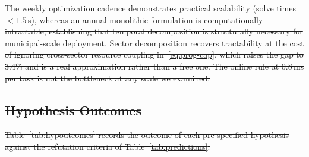 \documentclass[utf8]{FrontiersinHarvard}
\providecommand{\DIFdel}[1]{{\protect\color{red}\sout{#1}}}                      %
\begin{document}
\DIFdel{The weekly optimization cadence demonstrates practical scalability (solve times $<1.5$\,s), whereas an annual monolithic formulation is computationally intractable, establishing that temporal decomposition is structurally necessary for municipal-scale deployment. Sector decomposition recovers tractability at the cost of ignoring cross-sector resource coupling in~\eqref{eq:prog-cap}, which raises the gap to 3.4\% and is a real approximation rather than a free one. The online rule at 0.8\,ms per task is not the bottleneck at any scale we examined.
	}%


\subsection{\DIFdel{Hypothesis Outcomes}}
\addtocounter{subsection}{-1}%

\DIFdel{Table~\ref{tab:hypoutcomes} records the outcome of each pre-specified hypothesis against the refutation criteria of Table~\ref{tab:predictions}.
	}%
\end{document}
